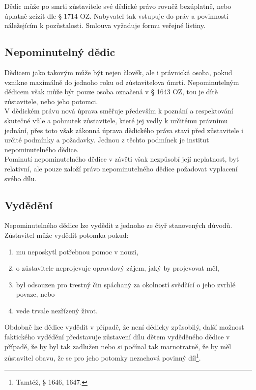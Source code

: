 \documentclass{article}
\begin{document}
Dědic může po smrti zůstavitele své dědické právo rovněž bezúplatně, nebo úplatně zcizit dle § 1714 OZ. Nabyvatel tak vstupuje do práv a povinností náležejícím k pozůstalosti. Smlouva vyžaduje formu veřejné listiny.\\

\subsection{Nepominutelný dědic}

Dědicem jako takovým může být nejen člověk, ale i právnická osoba, pokud vznikne maximálně do jednoho roku od zůstavitelova úmrtí. Nepominutelným dědicem však může být pouze osoba označená v § 1643 OZ, tou je dítě zůstavitele, nebo jeho potomci.\\

V dědickém právu nová úprava směřuje především k poznání a respektování skutečné vůle a pohnutek zůstavitele, které jej vedly k určitému právnímu jednání, přes toto však zákonná úprava dědického práva staví před zůstavitele i určité podmínky a požadavky. Jednou z těchto podmínek je institut nepominutelného dědice.\\

Pominutí nepominutelného dědice v závěti však nezpůsobí její neplatnost, byť relativní, ale pouze založí právo nepominutelného dědice požadovat vyplacení svého dílu.\\

\subsection{Vydědění}

Nepominutelného dědice lze vydědit z jednoho ze čtyř stanovených důvodů. Zůstavitel může vydědit potomka pokud:

\begin{enumerate}
\item mu neposkytl potřebnou pomoc v nouzi,
\item o zůstavitele neprojevuje opravdový zájem, jaký by projevovat měl,
\item byl odsouzen pro trestný čin spáchaný za okolností svědčící o jeho zvrhlé povaze, nebo
\item vede trvale nezřízený život.
\end{enumerate}

Obdobně lze dědice vydědit v případě, že není dědicky způsobilý, další možnost faktického vydědění představuje zůstavení dílu dětem vyděděného dědice v případě, že by byl tak zadlužen nebo si počínal tak marnotratně, že by měl zůstavitel obavu, že se pro jeho potomky nezachová povinný díl\footnote{Tamtéž, § 1646, 1647.}.\\
\end{document}
